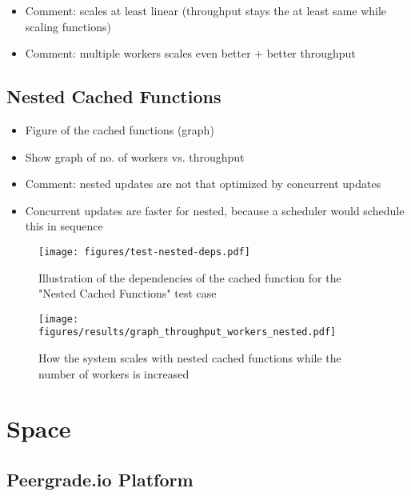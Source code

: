\begin{itemize}
  \item Comment: scales at least linear (throughput stays the at least same while scaling functions)
  \item Comment: multiple workers scales even better + better throughput
\end{itemize}


\subsection{Nested Cached Functions}
\label{subsec:nested-cached-functions}

\begin{itemize}
  \item Figure of the cached functions (graph)
  \item Show graph of no. of workers vs. throughput
  \item Comment: nested updates are not that optimized by concurrent updates
  \item Concurrent updates are faster for nested, because a scheduler would schedule this in sequence
\end{itemize}

\begin{figure*}[ht!]
  \centering
  \texttt{[image: figures/test-nested-deps.pdf]}
  \caption{Illustration of the dependencies of the cached function for the "Nested Cached Functions" test case}
  \label{fig:test-nested-deps}
\end{figure*}

\begin{figure*}[ht!]
  \centering
  \texttt{[image: figures/results/graph\_throughput\_workers\_nested.pdf]}
  \caption{How the system scales with nested cached functions while the number of workers is increased}
  \label{fig:graph_throughput_workers_nested}
\end{figure*}



\section{Space}
\label{sec:space}

\subsection{Peergrade.io Platform}
\label{subsec:peergrade-io-platform}

